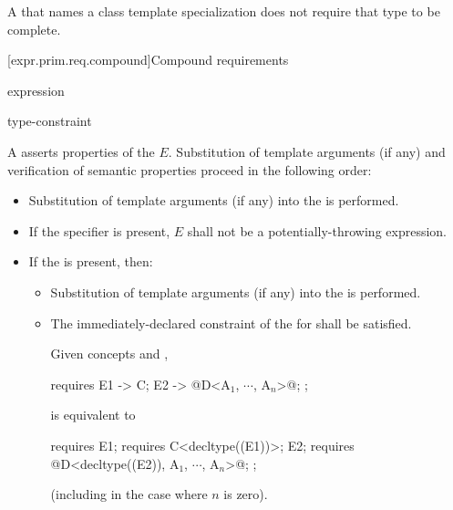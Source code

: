 \pnum
A  that names a class template specialization
does not require that type to be complete.

[expr.prim.req.compound]{Compound requirements}
%

\begin{bnf}
\br
    \terminal{\{} expression \terminal{\}}   \terminal{;}
\end{bnf}

\begin{bnf}
\br
    \terminal{->} type-constraint
\end{bnf}

\pnum
A  asserts properties
of the  $E$. Substitution
of template arguments (if any) and verification of
semantic properties proceed in the following order:
\begin{itemize}
\item
Substitution of template arguments (if any)
into the  is performed.

\item
If the  specifier is present,
$E$ shall not be a potentially-throwing expression.

\item
If the  is present, then:
\begin{itemize}
\item
Substitution of template arguments (if any)
into the  is performed.

\item
The immediately-declared constraint
of the  for 
shall be satisfied.
\begin{example}
Given concepts  and ,
\begin{codeblock}
requires {
  { E1 } -> C;
  { E2 } -> @D<A$_1$, $\cdots$, A$_n$>@;
};
\end{codeblock}
is equivalent to
\begin{codeblock}
requires {
  E1; requires C<decltype((E1))>;
  E2; requires @D<decltype((E2)), A$_1$, $\cdots$, A$_n$>@;
};
\end{codeblock}
(including in the case where $n$ is zero).
\end{example}
\end{itemize}
\end{itemize}

